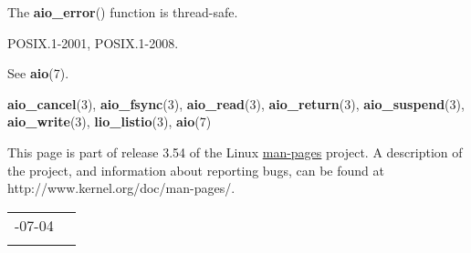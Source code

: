 \documentclass[]{article}
\let\realtextbf=\textbf
\renewcommand{\textbf}[1]{\textcolor{boldcolor}{\realtextbf{#1}}}
\renewcommand{\emph}[1]{\underline{#1}}
\begin{document}

The \textbf{aio\_error}() function is thread-safe.


POSIX.1-2001, POSIX.1-2008.


See \textbf{aio}(7).


\textbf{aio\_cancel}(3), \textbf{aio\_fsync}(3), \textbf{aio\_read}(3),
\textbf{aio\_return}(3), \textbf{aio\_suspend}(3),
\textbf{aio\_write}(3), \textbf{lio\_listio}(3), \textbf{aio}(7)


This page is part of release 3.54 of the Linux \emph{man-pages} project.
A description of the project, and information about reporting bugs, can
be found at http://www.kernel.org/doc/man-pages/.

\begin{longtable}[c]{@{}ll@{}}
\toprule\addlinespace
2013-07-04 &
\\\addlinespace
\bottomrule
\end{longtable}
\end{document}
